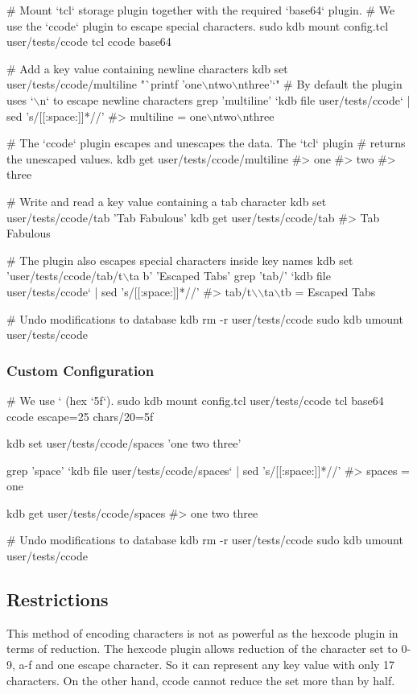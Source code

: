 \begin{DoxyCode}
# Mount `tcl` storage plugin together with the required `base64` plugin.
# We use the `ccode` plugin to escape special characters.
sudo kdb mount config.tcl user/tests/ccode tcl ccode base64

# Add a key value containing newline characters
kdb set user/tests/ccode/multiline "`printf 'one\(\backslash\)ntwo\(\backslash\)nthree'`"
# By default the plugin uses `\(\backslash\)n` to escape newline characters
grep 'multiline' `kdb file user/tests/ccode` | sed 's/[[:space:]]*//'
#> multiline = one\(\backslash\)ntwo\(\backslash\)nthree

# The `ccode` plugin escapes and unescapes the data. The `tcl` plugin
# returns the unescaped values.
kdb get user/tests/ccode/multiline
#> one
#> two
#> three

# Write and read a key value containing a tab character
kdb set user/tests/ccode/tab 'Tab       Fabulous'
kdb get user/tests/ccode/tab
#> Tab  Fabulous

# The plugin also escapes special characters inside key names
kdb set 'user/tests/ccode/tab/t\(\backslash\)ta      b' 'Escaped Tabs'
grep 'tab/' `kdb file user/tests/ccode` | sed 's/[[:space:]]*//'
#> tab/t\(\backslash\)\(\backslash\)ta\(\backslash\)tb = Escaped Tabs

# Undo modifications to database
kdb rm -r user/tests/ccode
sudo kdb umount user/tests/ccode
\end{DoxyCode}
\hypertarget{autotoc_md78_autotoc_md82}{}\subsubsection{Custom Configuration}\label{autotoc_md78_autotoc_md82}

\begin{DoxyCode}
# We use `%
       (hex `5f`).
sudo kdb mount config.tcl user/tests/ccode tcl base64 ccode escape=25 chars/20=5f

kdb set user/tests/ccode/spaces 'one two three'

grep 'space' `kdb file user/tests/ccode/spaces` | sed 's/[[:space:]]*//'
#> spaces = one%

kdb get user/tests/ccode/spaces
#> one two three

# Undo modifications to database
kdb rm -r user/tests/ccode
sudo kdb umount user/tests/ccode
\end{DoxyCode}
\hypertarget{autotoc_md78_autotoc_md83}{}\subsection{Restrictions}\label{autotoc_md78_autotoc_md83}
This method of encoding characters is not as powerful as the hexcode plugin in terms of reduction. The hexcode plugin allows reduction of the character set to \textquotesingle{}0\textquotesingle{}-\/\textquotesingle{}9\textquotesingle{}, \textquotesingle{}a\textquotesingle{}-\/\textquotesingle{}f\textquotesingle{} and one escape character. So it can represent any key value with only 17 characters. On the other hand, ccode cannot reduce the set more than by half.

